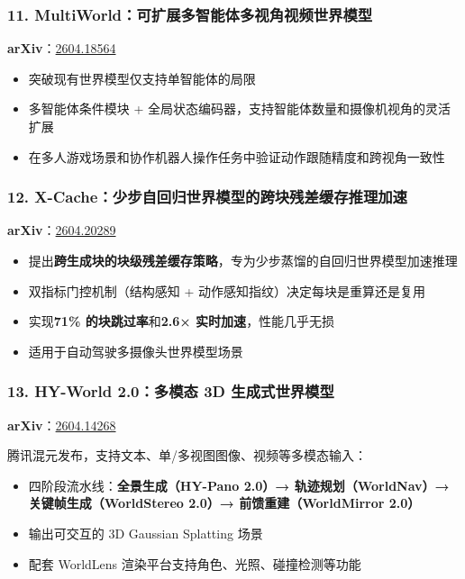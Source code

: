 \subsubsection{11. MultiWorld：可扩展多智能体多视角视频世界模型}

\textbf{arXiv}：\href{https://arxiv.org/abs/2604.18564}{2604.18564}

\begin{itemize}[leftmargin=1.5em]
  \item 突破现有世界模型仅支持单智能体的局限
  \item 多智能体条件模块 + 全局状态编码器，支持智能体数量和摄像机视角的灵活扩展
  \item 在多人游戏场景和协作机器人操作任务中验证动作跟随精度和跨视角一致性
\end{itemize}

\subsubsection{12. X-Cache：少步自回归世界模型的跨块残差缓存推理加速}

\textbf{arXiv}：\href{https://arxiv.org/abs/2604.20289}{2604.20289}

\begin{itemize}[leftmargin=1.5em]
  \item 提出\textbf{跨生成块的块级残差缓存策略}，专为少步蒸馏的自回归世界模型加速推理
  \item 双指标门控机制（结构感知 + 动作感知指纹）决定每块是重算还是复用
  \item 实现\textbf{71\% 的块跳过率}和\textbf{2.6× 实时加速}，性能几乎无损
  \item 适用于自动驾驶多摄像头世界模型场景
\end{itemize}

\subsubsection{13. HY-World 2.0：多模态 3D 生成式世界模型}

\textbf{arXiv}：\href{https://arxiv.org/abs/2604.14268}{2604.14268}

腾讯混元发布，支持文本、单/多视图图像、视频等多模态输入：

\begin{itemize}[leftmargin=1.5em]
  \item 四阶段流水线：\textbf{全景生成（HY-Pano 2.0）→ 轨迹规划（WorldNav）→ 关键帧生成（WorldStereo 2.0）→ 前馈重建（WorldMirror 2.0）}
  \item 输出可交互的 3D Gaussian Splatting 场景
  \item 配套 WorldLens 渲染平台支持角色、光照、碰撞检测等功能
\end{itemize}

